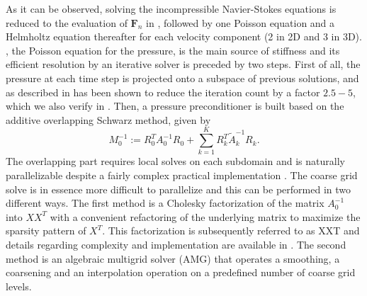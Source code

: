 \documentclass{sig-alternate}
\begin{document}
As it can be observed, solving the incompressible Navier-Stokes equations is reduced 
to the evaluation of $\mathbf{F}_n$ in , followed by one Poisson 
equation and a Helmholtz equation thereafter for each velocity component (2 in 2D and 3 in 3D). 
, the Poisson equation for the pressure, is the main 
source of stiffness and its efficient resolution by an iterative solver is preceded 
by two steps. First of all, the pressure at each time step is projected onto a 
subspace of previous solutions, and as described in \cite{Fischer1998} has been shown 
to reduce the iteration count by a factor $2.5-5$, which we also verify in .
Then, a pressure preconditioner is built based on the additive overlapping Schwarz 
method, given by 
\begin{equation}
 M_0^{-1} := R_0^T A_{0}^{-1} R_0 + \sum_{k=1}^{K} R_k^T \tilde{A}_k^{-1} R_k.
\end{equation}
The overlapping part requires local solves on each subdomain and is naturally parallelizable 
despite a fairly complex practical implementation \cite{Fischer199784,Fischer2005}. 
The coarse grid solve is in essence more difficult to parallelize and this can be 
performed in two different ways. The first 
method is a Cholesky factorization of the matrix $A_0^{-1}$ into $XX^T$ with a 
convenient refactoring of the underlying matrix to maximize the sparsity pattern 
of $X^T$. This factorization is subsequently referred to as XXT and details 
regarding complexity and implementation are available in \cite{Tufo2001151}. The 
second method is an algebraic multigrid solver (AMG) that operates a smoothing, 
a coarsening and an interpolation operation on a predefined number of coarse grid 
levels. 
\end{document}
